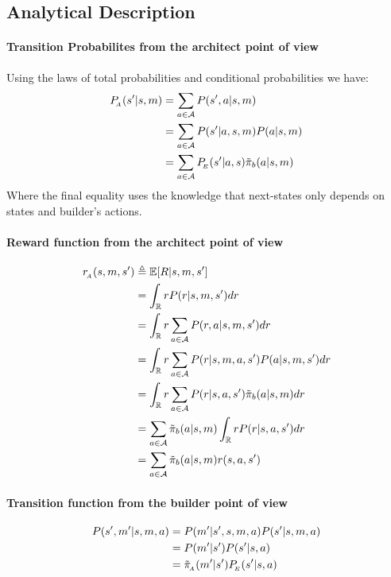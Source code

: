 \subsection{Analytical Description}
\label{ap:method_analytic}
\paragraph{Transition Probabilites from the architect point of view}
Using the laws of total probabilities and conditional probabilities we have: 
\begin{equation}
    \begin{split}
        P_{\!_A}(s'|s,m) &= \sum_{a\in{\mathcal{A}}} P(s',a | s,m)\\ 
        &= \sum_{a\in{\mathcal{A}}} P(s'|a,s,m) P(a|s,m)\\
        &= \sum_{a\in{\mathcal{A}}} P_{\!_E}(s'|a,s) \tilde{\pi}_b(a|s,m)
    \end{split}
\end{equation}
Where the final equality uses the knowledge that next-states only depends on states and builder's actions. 

\paragraph{Reward function from the architect point of view}
\begin{equation}
    \begin{split}
        r_{\!_A}(s,m,s') &\triangleq \mathbb{E}[R|s,m,s']\\
        &= \int_{\mathbb{R}}r P(r|s,m,s')dr \\
        &= \int_{\mathbb{R}} r\sum_{a\in{\mathcal{A}}}P(r,a|s,m,s')dr\\
        &= \int_{\mathbb{R}} r\sum_{a\in{\mathcal{A}}}P(r|s,m,a,s')P(a|s,m,s')dr\\
        &= \int_{\mathbb{R}} r\sum_{a\in{\mathcal{A}}}P(r|s,a,s')\tilde{\pi}_b(a|s,m)dr\\
        &= \sum_{a\in{\mathcal{A}}}\tilde{\pi}_b(a|s,m)\int_{\mathbb{R}}rP(r|s,a,s')dr\\
        &= \sum_{a\in{\mathcal{A}}}\tilde{\pi}_b(a|s,m)r(s,a,s')
    \end{split}
\end{equation}

\paragraph{Transition function from the builder point of view}
\begin{equation}
    \begin{split}
        P(s',m'|s,m,a) &= P(m'|s',s,m,a)P(s'|s,m,a)\\
        &= P(m'|s')P(s'|s,a)\\
        &= \tilde{\pi}_{\!_A}(m'|s') P_{\!_E}(s'|s,a)
    \end{split}
\end{equation}

